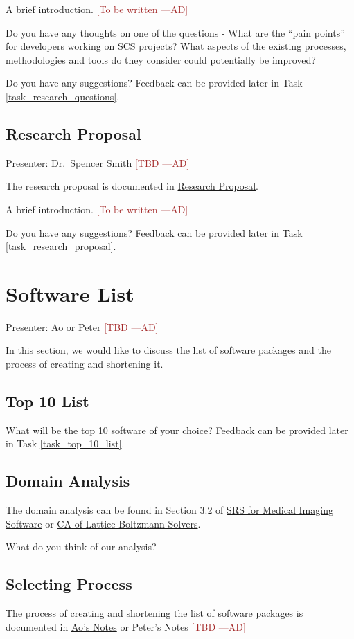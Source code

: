 \documentclass[12pt]{article}
\newcommand{\authornote}[3]{\textcolor{#1}{[#3 ---#2]}}
\newcommand{\authornote}[3]{}
\newcommand{\ad}[1]{\authornote{brown}{AD}{#1}} %
\begin{document}
A brief introduction. \ad{To be written}

Do you have any thoughts on one of the questions - What are the ``pain points''
for developers working on SCS projects? What aspects of the existing processes,
methodologies and tools do they consider could potentially be improved?

Do you have any suggestions? Feedback can be provided later in Task
\ref{task_research_questions}.

\subsection{Research Proposal}
\label{research_proposal}
Presenter: Dr.\ Spencer Smith \ad{TBD}

The research proposal is documented in
\href{https://github.com/smiths/AIMSS/blob/master/OverallResearchProposal/ResearchProposal.pdf}{Research
Proposal}.

A brief introduction. \ad{To be written}

Do you have any suggestions? Feedback can be provided later in Task
\ref{task_research_proposal}.

\section{Software List}
Presenter: Ao or Peter \ad{TBD}

In this section, we would like to discuss the list of software packages and the
process of creating and shortening it.

\subsection{Top 10 List}
\label{top_10_list}
What will be the top 10 software of your choice? Feedback can be provided later
in Task \ref{task_top_10_list}.

\subsection{Domain Analysis}
The domain analysis can be found in Section 3.2 of
\href{https://github.com/Ao99/MISEG/blob/master/docs/SRS/SRS.pdf}{SRS for
Medical Imaging Software} or
\href{https://github.com/peter-michalski/LatticeBoltzmannSolvers/blob/master/docs/SRS/CA.pdf}{CA
of Lattice Boltzmann Solvers}.

What do you think of our analysis?

\subsection{Selecting Process}
The process of creating and shortening the list of software packages is
documented in
\href{https://github.com/smiths/AIMSS/blob/master/StateOfPractice/Ao-Notes/Ao-Notes.pdf}{Ao's
Notes} or Peter's Notes \ad{TBD}
\end{document}

